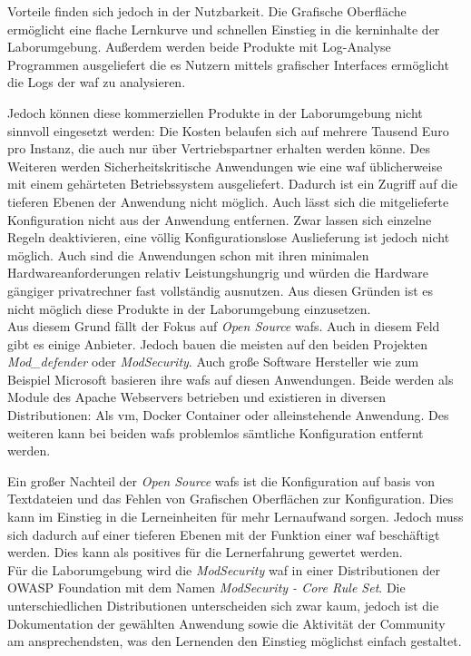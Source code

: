 Vorteile finden sich jedoch in der Nutzbarkeit.
Die Grafische Oberfläche ermöglicht eine flache Lernkurve und schnellen Einstieg in die kerninhalte der Laborumgebung.
Außerdem werden beide Produkte mit Log-Analyse Programmen ausgeliefert die es Nutzern mittels grafischer Interfaces ermöglicht die Logs der \ac{waf} zu analysieren.

Jedoch können diese kommerziellen Produkte in der Laborumgebung nicht sinnvoll eingesetzt werden:
Die Kosten belaufen sich auf mehrere Tausend Euro pro Instanz, die auch nur über Vertriebspartner erhalten werden könne.
Des Weiteren werden Sicherheitskritische Anwendungen wie eine \ac{waf} üblicherweise mit einem gehärteten Betriebssystem ausgeliefert.
Dadurch ist ein Zugriff auf die tieferen Ebenen der Anwendung nicht möglich.
Auch lässt sich die mitgelieferte Konfiguration nicht aus der Anwendung entfernen.
Zwar lassen sich einzelne Regeln deaktivieren, eine völlig Konfigurationslose Auslieferung ist jedoch nicht möglich.
Auch sind die Anwendungen schon mit ihren minimalen Hardwareanforderungen relativ Leistungshungrig und würden die Hardware gängiger privatrechner fast vollständig ausnutzen.
Aus diesen Gründen ist es nicht möglich diese Produkte in der Laborumgebung einzusetzen.\\

Aus diesem Grund fällt der Fokus auf \textit{Open Source} \acp{waf}.
Auch in diesem Feld gibt es einige Anbieter.
Jedoch bauen die meisten auf den beiden Projekten \textit{Mod\_defender} oder \textit{ModSecurity}.
Auch große Software Hersteller wie zum Beispiel Microsoft basieren ihre \acp{waf} auf diesen Anwendungen.
Beide werden als Module des Apache Webservers betrieben und existieren in diversen Distributionen: Als \ac{vm}, Docker Container oder alleinstehende Anwendung.
Des weiteren kann bei beiden \acp{waf} problemlos sämtliche Konfiguration entfernt werden.

Ein großer Nachteil der \textit{Open Source} \acp{waf} ist die Konfiguration auf basis von Textdateien und das Fehlen von Grafischen Oberflächen zur Konfiguration.
Dies kann im Einstieg in die Lerneinheiten für mehr Lernaufwand sorgen.
Jedoch muss sich dadurch auf einer tieferen Ebenen mit der Funktion einer \ac{waf} beschäftigt werden.
Dies kann als positives für die Lernerfahrung gewertet werden.\\

Für die Laborumgebung wird die \textit{ModSecurity} waf in einer Distributionen der OWASP Foundation mit dem Namen \textit{ModSecurity - Core Rule Set}.
Die unterschiedlichen Distributionen unterscheiden sich zwar kaum, jedoch ist die Dokumentation der gewählten Anwendung sowie die Aktivität der Community am ansprechendsten, was den Lernenden den Einstieg möglichst einfach gestaltet.

